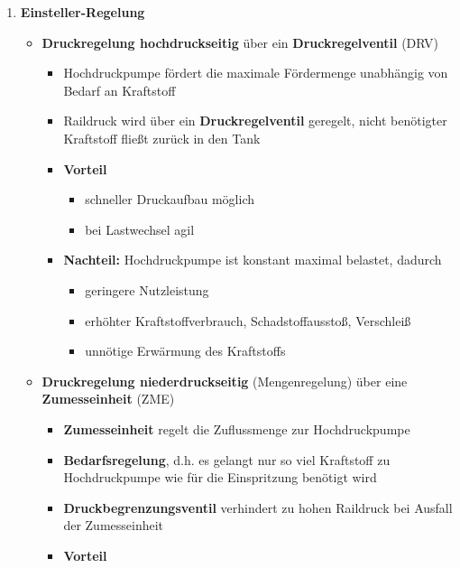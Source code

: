 \begin{enumerate}
\item
  \textbf{Einsteller-Regelung}

  \begin{itemize}
  \item
    \textbf{Druckregelung hochdruckseitig} über ein
    \textbf{Druckregelventil} (DRV)

    \begin{itemize}
    \item
      Hochdruckpumpe fördert die maximale Fördermenge unabhängig von
      Bedarf an Kraftstoff
    \item
      Raildruck wird über ein \textbf{Druckregelventil} geregelt, nicht
      benötigter Kraftstoff fließt zurück in den Tank
    \item
      \textbf{Vorteil}

      \begin{itemize}
      \item
        schneller Druckaufbau möglich
      \item
        bei Lastwechsel agil
      \end{itemize}
    \item
      \textbf{Nachteil:} Hochdruckpumpe ist konstant maximal belastet,
      dadurch

      \begin{itemize}
      \item
        geringere Nutzleistung
      \item
        erhöhter Kraftstoffverbrauch, Schadstoffausstoß, Verschleiß
      \item
        unnötige Erwärmung des Kraftstoffs
      \end{itemize}
    \end{itemize}
  \item
    \textbf{Druckregelung niederdruckseitig} (Mengenregelung) über eine
    \textbf{Zumesseinheit} (ZME)

    \begin{itemize}
    \item
      \textbf{Zumesseinheit} regelt die Zuflussmenge zur Hochdruckpumpe
    \item
      \textbf{Bedarfsregelung}, d.h. es gelangt nur so viel Kraftstoff
      zu Hochdruckpumpe wie für die Einspritzung benötigt wird
    \item
      \textbf{Druckbegrenzungsventil} verhindert zu hohen Raildruck bei
      Ausfall der Zumesseinheit
    \item
      \textbf{Vorteil}


\end{itemize}
\end{itemize}
\end{enumerate}
